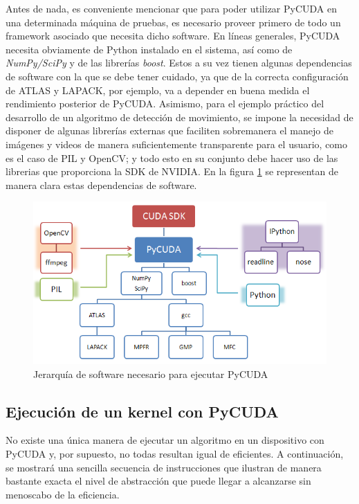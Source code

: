 \documentclass[twocolumn,twoside]{Jornadas}
\begin{document}
Antes de nada, es conveniente mencionar que para poder utilizar PyCUDA en una determinada máquina de pruebas, es necesario proveer primero de todo un framework asociado que necesita dicho software. En líneas generales, PyCUDA necesita obviamente de Python instalado en el sistema, así como de \emph{NumPy/SciPy} y de las librerías \emph{boost}. Estos a su vez tienen algunas dependencias de software con la que se debe tener cuidado, ya que de la correcta configuración de ATLAS y LAPACK, por ejemplo, va a depender en buena medida el rendimiento posterior de PyCUDA. Asimismo, para el ejemplo práctico del desarrollo de un algoritmo de detección de movimiento, se impone la necesidad de disponer de algunas librerías externas que faciliten sobremanera el manejo de imágenes y videos de manera suficientemente transparente para el usuario, como es el caso de PIL y OpenCV; y todo esto en su conjunto debe hacer uso de las librerias que proporciona la SDK de NVIDIA. En la figura \ref{fig:installedDependecies} se representan de manera clara estas dependencias de software.

\begin{figure}
   \begin{center}
      \includegraphics[width=.5\textwidth]{installedDependecies.png}
      \caption{\label{fig:installedDependecies} Jerarquía de software necesario para ejecutar PyCUDA}
   \end{center}
\end{figure}

\subsection{Ejecución de un kernel con PyCUDA}

No existe una única manera de ejecutar un algoritmo en un dispositivo con PyCUDA y, por supuesto, no todas resultan igual de eficientes. A continuación, se mostrará una sencilla secuencia de instrucciones que ilustran de manera bastante exacta el nivel de abstracción que puede llegar a alcanzarse sin menoscabo de la eficiencia.

\vspace{5 mm}
\end{document}
